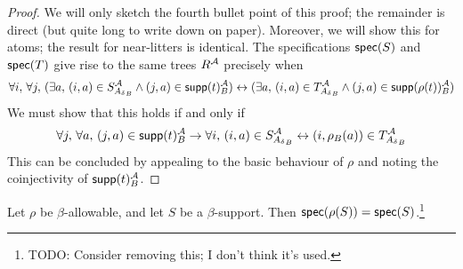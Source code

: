 \begin{proof}
  We will only sketch the fourth bullet point of this proof; the remainder is direct (but quite long to write down on paper).
  Moreover, we will show this for atoms; the result for near-litters is identical.
  The specifications \( \operatorname{\mathsf{spec}}(S) \) and \( \operatorname{\mathsf{spec}}(T) \) give rise to the same trees \( R^{\mathcal A} \) precisely when
  \[ \forall i,\, \forall j,\, (\exists a,\, (i, a) \in S_{{A_\delta}_B}^{\mathcal A} \wedge (j, a) \in \operatorname{\mathsf{supp}}(t)_B^{\mathcal A}) \leftrightarrow (\exists a,\, (i, a) \in T_{{A_\delta}_B}^{\mathcal A} \wedge (j, a) \in \operatorname{\mathsf{supp}}(\rho(t))_B^{\mathcal A}) \]
  We must show that this holds if and only if
  \[ \forall j,\, \forall a,\, (j, a) \in \operatorname{\mathsf{supp}}(t)_B^{\mathcal A} \to \forall i,\, (i, a) \in S_{{A_\delta}_B}^{\mathcal A} \leftrightarrow (i, \rho_B(a)) \in T_{{A_\delta}_B}^{\mathcal A} \]
  This can be concluded by appealing to the basic behaviour of \( \rho \) and noting the coinjectivity of \( \operatorname{\mathsf{supp}}(t)_B^{\mathcal A} \).
\end{proof}
\begin{proposition}
  \label{def:spec_smul}
  Let \( \rho \) be \( \beta \)-allowable, and let \( S \) be a \( \beta \)-support.
  Then \( \operatorname{\mathsf{spec}}(\rho(S)) = \operatorname{\mathsf{spec}}(S) \).\footnote{TODO: Consider removing this; I don't think it's used.}
\end{proposition}
